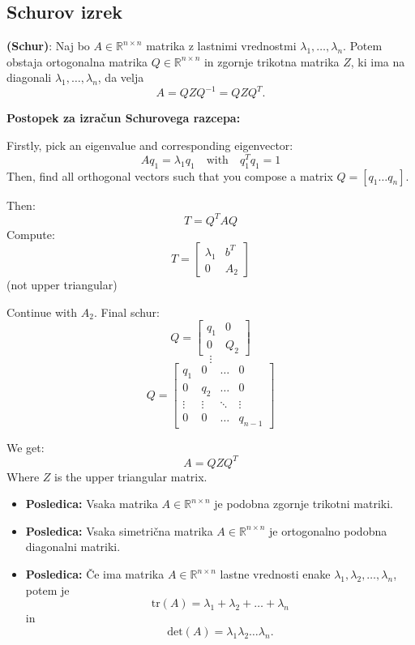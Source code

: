 \documentclass{article}
\begin{document}
\begin{multicols}{2}
\subsection{Schurov izrek}

\textbf{(Schur)}: Naj bo \( A \in \mathbb{R}^{n \times n} \) matrika z lastnimi vrednostmi \( \lambda_1, \ldots, \lambda_n \). Potem obstaja ortogonalna matrika \( Q \in \mathbb{R}^{n \times n} \) in zgornje trikotna matrika \( Z \), ki ima na diagonali \( \lambda_1, \ldots, \lambda_n \), da velja
\[ A = QZQ^{-1} = QZQ^T. \]

\textbf{Postopek za izračun Schurovega razcepa:}

Firstly, pick an eigenvalue and corresponding eigenvector:
\[
Aq_1 = \lambda_1 q_1 \quad \text{with} \quad q_1^Tq_1=1
\]
Then, find all orthogonal vectors such that you compose a matrix \( Q = [q_1 \dots q_n] \).

Then:
\[
T = Q^TAQ
\]
Compute:
\[
T = \begin{bmatrix}
\lambda_1 & b^T \\
0 & A_2
\end{bmatrix}
\]
(not upper triangular)

Continue with \( A_2 \). Final schur:
\[
Q = \begin{bmatrix}
q_1 & 0 \\
0 & Q_2
\end{bmatrix}
\]
\[
\vdots
\]
\[
Q = \begin{bmatrix}
q_1 & 0 & \dots & 0 \\
0 & q_2 & \dots & 0 \\
\vdots & \vdots & \ddots & \vdots \\
0 & 0 & \dots & q_{n-1}
\end{bmatrix}
\]

We get:
\[
A = QZQ^T
\]
Where \( Z \) is the upper triangular matrix.


\begin{itemize}
    \item \textbf{Posledica:} Vsaka matrika \( A \in \mathbb{R}^{n \times n} \) je podobna zgornje trikotni matriki.
    
    \item \textbf{Posledica:} Vsaka simetrična matrika \( A \in \mathbb{R}^{n \times n} \) je ortogonalno podobna diagonalni matriki.
    
    \item \textbf{Posledica:} Če ima matrika \( A \in \mathbb{R}^{n \times n} \) lastne vrednosti enake \( \lambda_1, \lambda_2, \ldots, \lambda_n \), potem je
    \[
    \text{tr}(A) = \lambda_1 + \lambda_2 + \ldots + \lambda_n
    \]
    in
    \[
    \text{det}(A) = \lambda_1 \lambda_2 \ldots \lambda_n.
    \]
    

\end{itemize}
\end{multicols}
\end{document}
